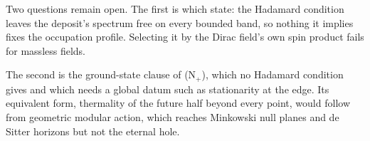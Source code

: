 \documentclass[11pt]{article}
\theoremstyle{definition}
\theoremstyle{plain}
\begin{document}
Two questions remain open. The first is which state: the Hadamard condition leaves the deposit's spectrum free on every bounded band, so nothing it implies fixes the occupation profile. Selecting it by the Dirac field's own spin product fails for massless fields.

The second is the ground-state clause of (N$_{+}$), which no Hadamard condition gives and which needs a global datum such as stationarity at the edge. Its equivalent form, thermality of the future half beyond every point, would follow from geometric modular action, which reaches Minkowski null planes and de Sitter horizons but not the eternal hole.
\end{document}
